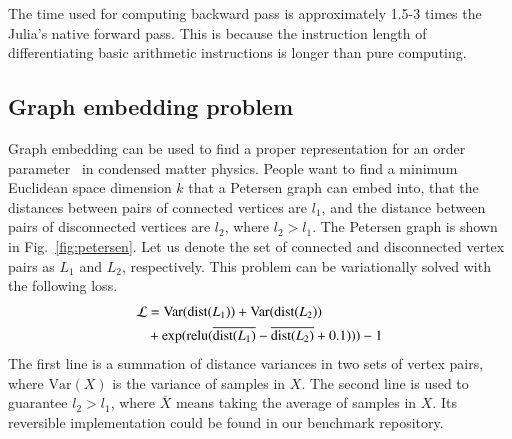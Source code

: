 \documentclass{article}
\newcommand{\<}{\langle}
\renewcommand{\>}{\rangle}
\newcommand{\Var}{{\mathrm{Var}}}
\newcommand{\Fig}[1]{Fig.~\ref{#1}}
\newcommand{\ra}[1]{\renewcommand{\arraystretch}{#1}}
\theoremstyle{definition}\newtheorem{definition}{\textit{Definition}}
\begin{document}
\begin{table}[h!]\centering
\begin{minipage}{0.8\columnwidth}
\ra{1.3}
    \caption{Absolute runtimes in seconds for computing the objectives (O) and the backward pass (B) of sparse matrix operations. The matrix size is $1000 \times 1000$, and the element density is $0.05$. The total time used in computing gradient can be estimated by summing ``O'' and ``B''.
    }\label{tbl:sparse}
\end{minipage}
\end{table}

The time used for computing backward pass is approximately 1.5-3 times the Julia's native forward pass.
This is because the instruction length of differentiating basic arithmetic instructions is longer than pure computing.


\subsection{Graph embedding problem}\label{sec:graphbench}
Graph embedding can be used to find a proper representation for an order parameter~\cite{Takahashi2020} in condensed matter physics. People want to find a minimum Euclidean space dimension $k$ that a Petersen graph can embed into, that the distances between pairs of connected vertices are $l_1$, and the distance between pairs of disconnected vertices are $l_2$, where $l_2 > l_1$.
The Petersen graph is shown in \Fig{fig:petersen}.
Let us denote the set of connected and disconnected vertex pairs as $L_1$ and $L_2$, respectively. This problem can be variationally solved with the following loss.
\begin{align}
    \begin{split}
        \mathcal{L} &= \Var({\rm dist}(L_1)) + \Var({\rm dist}(L_2)) \\
        &+\exp({\rm relu}(\overline{{\rm dist}(L_1)} - \overline{{\rm dist}(L_2)} + 0.1))) - 1
    \end{split}
\end{align}
The first line is a summation of distance variances in two sets of vertex pairs, where $\Var(X)$ is the variance of samples in $X$.
The second line is used to guarantee $l_2 > l_1$, where $\overline{X}$ means taking the average of samples in $X$.
Its reversible implementation could be found in our benchmark repository.
\end{document}
